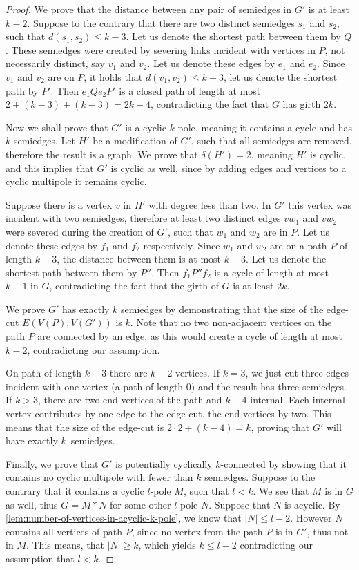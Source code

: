 \documentclass[12pt, twoside]{book}
\begin{document}
\begin{proof}
	We prove that the distance between any pair of semiedges in $G'$ is at least $k-2$. Suppose to the contrary that there are two distinct semiedges $s_1$ and $s_2$, such that ${d(s_1,s_2)\leq k-3}$. Let us denote the shortest path between them by $Q$. These semiedges were created by severing links incident with vertices in $P$, not necessarily distinct, say $v_1$ and $v_2$. Let us denote these edges by $e_1$ and $e_2$. Since $v_1$ and $v_2$ are on $P$, it holds that $d(v_1,v_2)\leq k-3$, let us denote the shortest path by $P'$. Then $e_1Qe_2P'$ is a closed path of length at most $2+(k-3)+(k-3)=2k-4$, contradicting the fact that $G$ has girth $2k$.
	
	Now we shall prove that $G'$ is a cyclic $k$-pole, meaning it contains a cycle and has $k$ semiedges. Let $H'$ be a modification of $G'$, such that all semiedges are removed, therefore the result is a graph. We prove that $\delta(H')=2$, meaning $H'$ is cyclic, and this implies that $G'$ is cyclic as well, since by adding edges and vertices to a cyclic multipole it remains cyclic.
	
	Suppose there is a vertex $v$ in $H'$ with degree less than two. In $G'$ this vertex was incident with two semiedges, therefore at least two distinct edges ${vw_1}$ and ${vw_2}$ were severed during the creation of $G'$, such that $w_1$ and $w_2$ are in $P$. Let us denote these edges by $f_1$ and $f_2$ respectively. Since $w_1$ and $w_2$ are on a path $P$ of length $k-3$, the distance between them is at most $k-3$. Let us denote the shortest path between them by $P''$. Then $f_1P''f_2$ is a cycle of length at most $k-1$ in $G$, contradicting the fact that the girth of $G$ is at least $2k$.
	
	We prove $G'$ has exactly $k$ semiedges by demonstrating that the size of the edge-cut $E\left(V(P), V(G')\right)$ is $k$. Note that no two non-adjacent vertices on the path $P$ are connected by an edge, as this would create a cycle of length at most $k-2$, contradicting our assumption.
	
	On path of length $k-3$ there are $k-2$ vertices. If $k=3$, we just cut three edges incident with one vertex (a path of length 0) and the result has three semiedges. If $k > 3$, there are two end vertices of the path and $k-4$ internal. Each internal vertex contributes by one edge to the edge-cut, the end vertices by two. This means that the size of the edge-cut is $2\cdot 2 + (k-4)=k$, proving that $G'$ will have exactly $k$~semiedges.
	
	Finally, we prove that $G'$ is potentially cyclically $k$-connected by showing that it contains no cyclic multipole with fewer than $k$ semiedges. Suppose to the contrary that it contains a cyclic $l$-pole $M$, such that $l<k$. We see that $M$ is in $G$ as well, thus $G=M*N$ for some other $l$-pole $N$. Suppose that $N$ is acyclic. By \cref{lem:number-of-vertices-in-acyclic-k-pole}, we know that $|N|\leq l-2$. However $N$ contains all vertices of path $P$, since no vertex from the path $P$ is in $G'$, thus not in $M$. This means, that $|N|\geq k$, which yields $k\leq l-2$ contradicting our assumption that $l<k$.
	

\end{proof}
\end{document}
